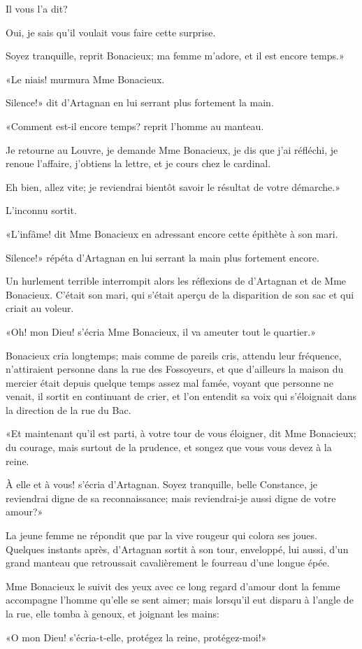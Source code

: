 \speak  Il vous l'a dit? 

\speak  Oui, je sais qu'il voulait vous faire cette surprise. 

\speak  Soyez tranquille, reprit Bonacieux; ma femme m'adore, et il est encore temps.» 

«Le niais! murmura Mme Bonacieux. 

\speak  Silence!» dit d'Artagnan en lui serrant plus fortement la main. 

«Comment est-il encore temps? reprit l'homme au manteau. 

\speak  Je retourne au Louvre, je demande Mme Bonacieux, je dis que j'ai réfléchi, je renoue l'affaire, j'obtiens la lettre, et je cours chez le cardinal. 

\speak  Eh bien, allez vite; je reviendrai bientôt savoir le résultat de votre démarche.» 

L'inconnu sortit. 

«L'infâme! dit Mme Bonacieux en adressant encore cette épithète à son mari. 

\speak  Silence!» répéta d'Artagnan en lui serrant la main plus fortement encore. 

Un hurlement terrible interrompit alors les réflexions de d'Artagnan et de Mme Bonacieux. C'était son mari, qui s'était aperçu de la disparition de son sac et qui criait au voleur. 

«Oh! mon Dieu! s'écria Mme Bonacieux, il va ameuter tout le quartier.» 

Bonacieux cria longtemps; mais comme de pareils cris, attendu leur fréquence, n'attiraient personne dans la rue des Fossoyeurs, et que d'ailleurs la maison du mercier était depuis quelque temps assez mal famée, voyant que personne ne venait, il sortit en continuant de crier, et l'on entendit sa voix qui s'éloignait dans la direction de la rue du Bac. 

«Et maintenant qu'il est parti, à votre tour de vous éloigner, dit Mme Bonacieux; du courage, mais surtout de la prudence, et songez que vous vous devez à la reine. 

\speak  À elle et à vous! s'écria d'Artagnan. Soyez tranquille, belle Constance, je reviendrai digne de sa reconnaissance; mais reviendrai-je aussi digne de votre amour?» 

La jeune femme ne répondit que par la vive rougeur qui colora ses joues. Quelques instants après, d'Artagnan sortit à son tour, enveloppé, lui aussi, d'un grand manteau que retroussait cavalièrement le fourreau d'une longue épée. 

Mme Bonacieux le suivit des yeux avec ce long regard d'amour dont la femme accompagne l'homme qu'elle se sent aimer; mais lorsqu'il eut disparu à l'angle de la rue, elle tomba à genoux, et joignant les mains: 

«O mon Dieu! s'écria-t-elle, protégez la reine, protégez-moi!»
